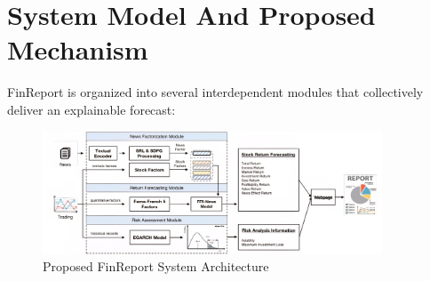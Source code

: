 \documentclass[3p,times,procedia]{elsarticle}
\begin{document}
\section{System Model And Proposed Mechanism}
FinReport is organized into several interdependent modules that collectively deliver an explainable forecast:
\begin{figure}[!ht] %
    \centering
    \includegraphics[width=0.90\textwidth]{flowchart.jpg} %

    \caption{Proposed FinReport System Architecture}
    \label{fig:workflow_diagram}
\end{figure}
\end{document}
